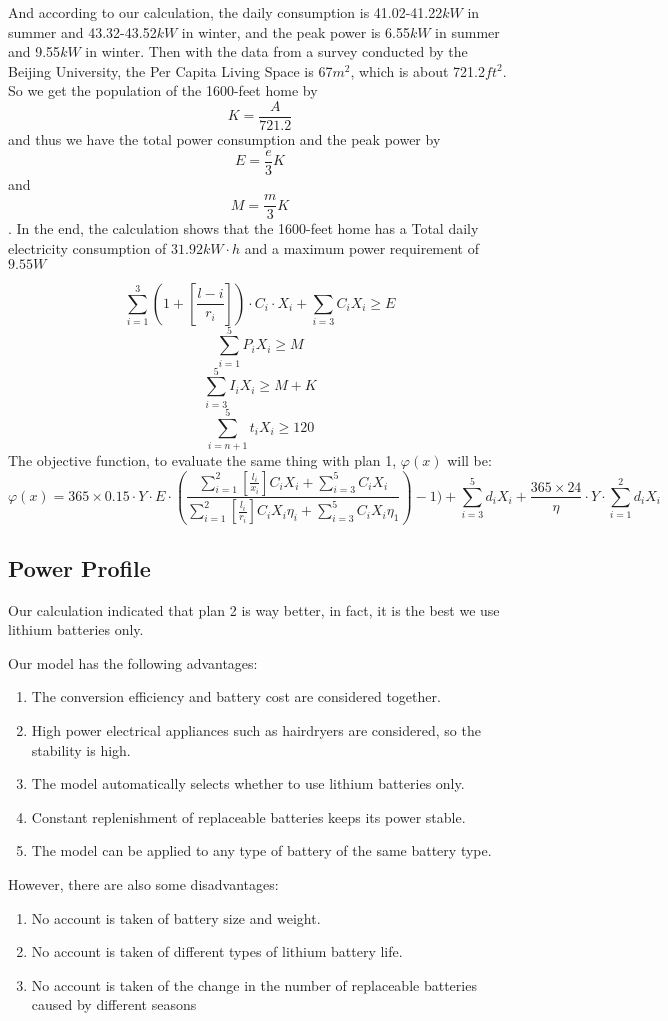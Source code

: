 \documentclass[12pt]{article}
\begin{document}
And according to our calculation, the daily consumption is 41.02-41.22$kW$ in summer and 43.32-43.52$kW$ in winter, and the peak power is 6.55$kW$ in summer and 9.55$kW$ in winter.
\newline
\newline
Then with the data from a survey conducted by the Beijing University, the Per Capita Living Space is 67$m^2$, which is about 721.2$ft^2$. So we get the population of the 1600-feet home
by $$K=\frac{A}{721.2}$$ and thus we have the total power consumption and the peak power by $$E=\frac{e}{3}K$$ and $$M=\frac{m}{3}K$$. In the end, the calculation shows that the 1600-feet home has a Total daily electricity consumption
of $31.92kW\cdot h$ and a maximum power requirement of $9.55W$


$$\sum_{i=1}^3(1+[\frac{l-i}{r_i}]) \cdot C_i \cdot X_i + \sum_{i=3}C_iX_i\geq E$$
$$\sum_{i=1}^5P_iX_i\geq M$$
$$\sum_{i=3}^5I_iX_i\geq M+K$$
$$\sum_{i=n+1}^5 t_iX_i\geq 120$$
The objective function, to evaluate the same thing with plan 1, $\varphi (x)$ will be:
$$\varphi (x) = 365 \times 0.15 \cdot Y \cdot E \cdot (\frac{\sum^2_{i=1}[\frac{l_i}{x_i}]C_iX_i+\sum_{i=3}^5C_iX_i}{\sum^2_{i=1}[\frac{l_i}{r_i}]C_iX_i\eta _i+\sum_{i=3}^5C_iX_i\eta _1})-1)
    + \sum_{i=3} ^5d_iX_i+\frac{365 \times 24}{\eta } \cdot Y \cdot \sum_{i=1} ^2d_iX_i $$
\subsection{Power Profile}
Our calculation indicated that plan 2 is way better, in fact, it is the best we use lithium batteries only.
\newline
\begin{center}

\end{center}
Our model has the following advantages:
\begin{enumerate}
    \item The conversion efficiency and battery cost are considered together.
    \item High power electrical appliances such as hairdryers are considered, so the stability is high.
    \item The model automatically selects whether to use lithium batteries only.
    \item Constant replenishment of replaceable batteries keeps its power stable.
    \item The model can be applied to any type of battery of the same battery type.
\end{enumerate}
However, there are also some disadvantages:
\begin{enumerate}
    \item No account is taken of battery size and weight.
    \item No account is taken of different types of lithium battery life.
    \item No account is taken of the change in the number of replaceable batteries caused by different seasons
\end{enumerate}
\end{document}
